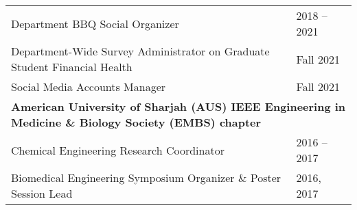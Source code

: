 \documentclass[letterpaper,11pt]{article}
\begin{document}
\begin{longtable}{@{}p{}l@{}}
  \hspace{3mm} Department BBQ Social Organizer                                                                                                                                                                    & 2018 -- 2021     \\
  \hspace{3mm} Department-Wide Survey Administrator on Graduate Student Financial Health                                                                                                                          & Fall 2021        \\
  \hspace{3mm} Social Media Accounts Manager                                                                                                                                                                      & Fall 2021        \\ [4pt]
  \multicolumn{2}{l}{\hspace{-3mm} \bf{American University of Sharjah (AUS) IEEE Engineering in Medicine \& Biology Society (EMBS) chapter}}                                                                                         \\
  \hspace{3mm} Chemical Engineering Research Coordinator                                                                                                                                                          & 2016 -- 2017     \\
  \hspace{3mm} Biomedical Engineering Symposium Organizer \& Poster Session Lead                                                                                                                                  & 2016, 2017       \\
\end{longtable}

\end{document}
